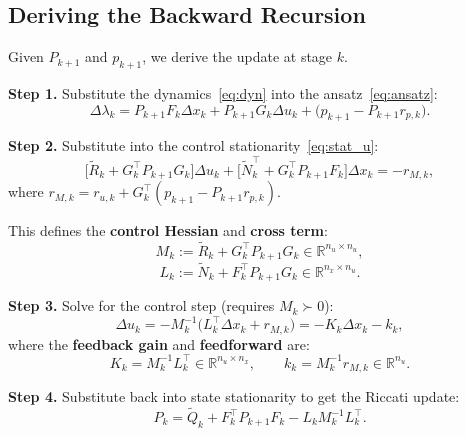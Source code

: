 \documentclass[11pt]{article}
\begin{document}
\subsection{Deriving the Backward Recursion}

Given $P_{k+1}$ and $p_{k+1}$, we derive the update at stage $k$.

\textbf{Step 1.} Substitute the dynamics~\eqref{eq:dyn} into the ansatz~\eqref{eq:ansatz}:
\begin{equation}\label{eq:dlambda_expand}
  \Delta \lambda_k = P_{k+1} F_k \Delta x_k + P_{k+1} G_k \Delta u_k
                   + \bigl(p_{k+1} - P_{k+1} r_{p,k}\bigr).
\end{equation}

\textbf{Step 2.} Substitute into the control stationarity~\eqref{eq:stat_u}:
\begin{equation}
  \bigl[\tilde{R}_k + G_k^\top P_{k+1} G_k\bigr] \Delta u_k
  + \bigl[\tilde{N}_k^\top + G_k^\top P_{k+1} F_k\bigr] \Delta x_k = -r_{M,k},
\end{equation}
where $r_{M,k} = r_{u,k} + G_k^\top(p_{k+1} - P_{k+1} r_{p,k})$.

This defines the \textbf{control Hessian} and \textbf{cross term}:
\begin{equation}\label{eq:Mk}
  \boxed{M_k := \tilde{R}_k + G_k^\top P_{k+1} G_k} \in \mathbb{R}^{n_u \times n_u},
\end{equation}
\begin{equation}\label{eq:Lk}
  L_k := \tilde{N}_k + F_k^\top P_{k+1} G_k \in \mathbb{R}^{n_x \times n_u}.
\end{equation}

\textbf{Step 3.} Solve for the control step (requires $M_k \succ 0$):
\begin{equation}\label{eq:Du}
  \Delta u_k = -M_k^{-1}\bigl(L_k^\top \Delta x_k + r_{M,k}\bigr)
             = -K_k \Delta x_k - k_k,
\end{equation}
where the \textbf{feedback gain} and \textbf{feedforward} are:
\begin{equation}
  K_k = M_k^{-1} L_k^\top \in \mathbb{R}^{n_u \times n_x}, \qquad
  k_k = M_k^{-1} r_{M,k} \in \mathbb{R}^{n_u}.
\end{equation}

\textbf{Step 4.} Substitute back into state stationarity to get the Riccati update:
\begin{equation}\label{eq:riccati}
  \boxed{P_k = \tilde{Q}_k + F_k^\top P_{k+1} F_k - L_k M_k^{-1} L_k^\top.}
\end{equation}
\end{document}
